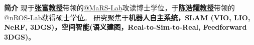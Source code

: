 %
%

\par{
{\textbf{简介}} 
现于\href{https://mars.hku.hk/}{\textbf{张富教授}}带领的\href{https://mars.hku.hk/}{@MaRS-Lab}攻读博士学位，于\href{http://nrs-lab.com//}{\textbf{陈浩耀教授}}带领的\href{http://nrs-lab.com/}{@nROS-Lab}获得硕士学位。
研究聚焦于\textbf{机器人自主系统，SLAM (VIO, LIO, NeRF, 3DGS)，空间智能(语义建图，Real-to-Sim-to-Real, Feedforward 3DGS)}。

}